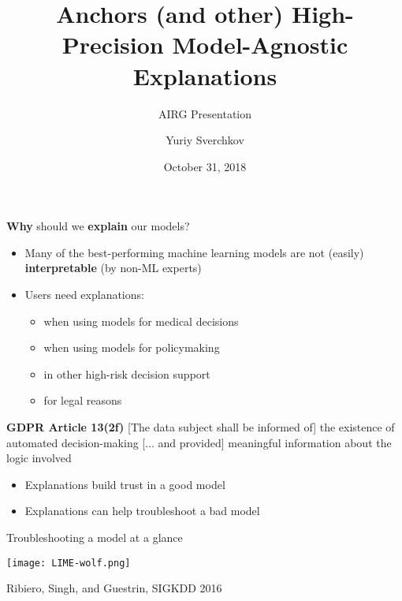 \documentclass[aspectratio=169]{beamer}
\title{Anchors (and other) High-Precision Model-Agnostic Explanations}
\subtitle{AIRG Presentation}
\author{Yuriy Sverchkov}
\institute{University of Wisconsin--Madison}
\date{October 31, 2018}
\begin{document}
  {
    \begin{frame}[plain]
      \vskip4cm
      \titlepage
    \end{frame}
  }


%

\begin{frame}{\textbf{Why} should we \textbf{explain} our models?}

\begin{itemize}[<+->]
	\item Many of the best-performing machine learning models are not (easily) \textbf{interpretable} (by non-ML experts)
	\item Users need explanations:
	\begin{itemize}
		\item when using models for medical decisions
		\item when using models for policymaking
		\item in other high-risk decision support
		\item for legal reasons
	\end{itemize}
\end{itemize}
\pause

\textbf{GDPR Article 13(2f)} [The data subject shall be informed of] the existence of automated decision-making [... and provided] meaningful information about the logic involved

\begin{itemize}[<+->]
	\item Explanations build trust in a good model
	\item Explanations can help troubleshoot a bad model
\end{itemize}
\end{frame}


\begin{frame}{Troubleshooting a model at a glance}
\vfill

\centering
\texttt{[image: LIME-wolf.png]}

\vfill

\raggedleft
\scriptsize
Ribiero, Singh, and Guestrin, SIGKDD 2016
\end{frame}
\end{document}
